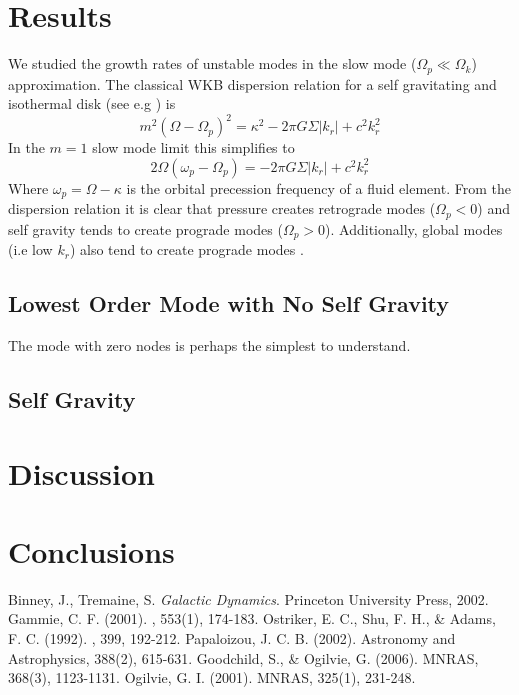 \documentclass[apj]{emulateapj}
\begin{document}
\section{Results}
We studied the growth rates of unstable modes in the slow mode ($\Omega_p \ll \Omega_k$) approximation. The classical WKB dispersion relation for a self gravitating and isothermal disk (see e.g \citet{bt2}) is
\begin{equation}
m^2(\Omega - \Omega_p)^2 = \kappa^2 - 2 \pi G \Sigma |k_r| + c^2 k_r^2 
\end{equation}
In the $m=1$ slow mode limit this simplifies to \citep{papa02}
\begin{equation}
2 \Omega ( \omega_p - \Omega_p) = - 2 \pi G \Sigma |k_r| + c^2 k_r^2 
\end{equation}
Where $\omega_p = \Omega - \kappa$ is the orbital precession frequency of a fluid element. From the dispersion relation it is clear that pressure creates retrograde modes ($\Omega_p < 0$) and self gravity tends to create prograde modes ($\Omega_p > 0$). Additionally, global modes (i.e low $k_r$) also tend to create prograde modes \citep{papa02}. 

\subsection{Lowest Order Mode with No Self Gravity}
The mode with zero nodes is perhaps the simplest to understand. 




\subsection{Self Gravity}
\section{Discussion}


\section{Conclusions}

\begin{thebibliography}{}
 Binney, J., Tremaine, S. \emph{Galactic Dynamics}. Princeton University Press, 2002.
 Gammie, C. F. (2001). \apj, 553(1), 174-183. 
 Ostriker, E. C., Shu, F. H., \& Adams, F. C. (1992). \apj, 399, 192-212. 
 Papaloizou, J. C. B. (2002). Astronomy and Astrophysics, 388(2), 615-631. 
 Goodchild, S., \& Ogilvie, G. (2006). MNRAS, 368(3), 1123-1131. 
 Ogilvie, G. I. (2001). MNRAS, 325(1), 231-248. 
\end{thebibliography}
\end{document}
